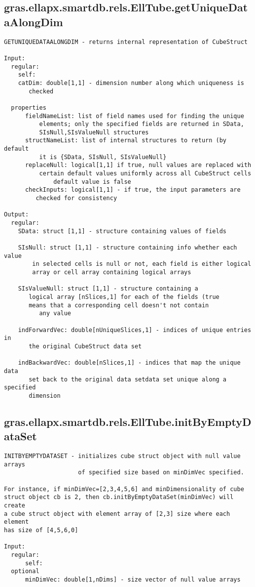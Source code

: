 \subsection{\texorpdfstring{gras.ellapx.smartdb.rels.EllTube.getUniqueDataAlongDim}{getUniqueDataAlongDim}}\label{method:gras.ellapx.smartdb.rels.EllTube.getUniqueDataAlongDim}
\begin{verbatim}
GETUNIQUEDATAALONGDIM - returns internal representation of CubeStruct

Input:
  regular:
    self:
    catDim: double[1,1] - dimension number along which uniqueness is
       checked

  properties
      fieldNameList: list of field names used for finding the unique
          elements; only the specified fields are returned in SData,
          SIsNull,SIsValueNull structures
      structNameList: list of internal structures to return (by default
          it is {SData, SIsNull, SIsValueNull}
      replaceNull: logical[1,1] if true, null values are replaced with
          certain default values uniformly across all CubeStruct cells
              default value is false
      checkInputs: logical[1,1] - if true, the input parameters are
         checked for consistency

Output:
  regular:
    SData: struct [1,1] - structure containing values of fields

    SIsNull: struct [1,1] - structure containing info whether each value
        in selected cells is null or not, each field is either logical
        array or cell array containing logical arrays

    SIsValueNull: struct [1,1] - structure containing a
       logical array [nSlices,1] for each of the fields (true
       means that a corresponding cell doesn't not contain
          any value

    indForwardVec: double[nUniqueSlices,1] - indices of unique entries in
       the original CubeStruct data set

    indBackwardVec: double[nSlices,1] - indices that map the unique data
       set back to the original data setdata set unique along a specified
       dimension
\end{verbatim}
\subsection{\texorpdfstring{gras.ellapx.smartdb.rels.EllTube.initByEmptyDataSet}{initByEmptyDataSet}}\label{method:gras.ellapx.smartdb.rels.EllTube.initByEmptyDataSet}
\begin{verbatim}
INITBYEMPTYDATASET - initializes cube struct object with null value arrays
                     of specified size based on minDimVec specified.

For instance, if minDimVec=[2,3,4,5,6] and minDimensionality of cube
struct object cb is 2, then cb.initByEmptyDataSet(minDimVec) will create
a cube struct object with element array of [2,3] size where each element
has size of [4,5,6,0]

Input:
  regular:
      self:
  optional
      minDimVec: double[1,nDims] - size vector of null value arrays
\end{verbatim}
